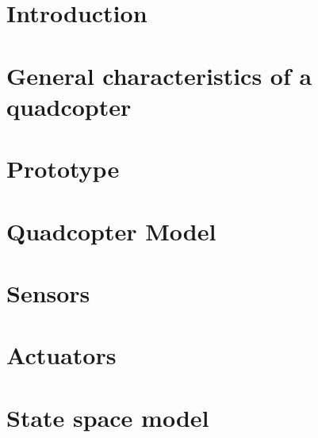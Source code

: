 




\sloppy
{}


\cleardoublepage

\date{\today}
\cleardoublepage

\tableofcontents

\cleardoublepage



\chapter{Introduction}\label{ch:introduction}

\clearpage

\chapter{General characteristics of a quadcopter}\label{ch:problemdesc}


\clearpage

\chapter{Prototype}\label{ch:psetup}


\clearpage

\chapter{Quadcopter Model}\label{ch:quadmodelling}

\clearpage

\chapter{Sensors}\label{ch:lab}


\clearpage
\chapter{Actuators}\label{ch:lab}


\clearpage

\chapter{State space model}\label{ch:lab}

\clearpage

